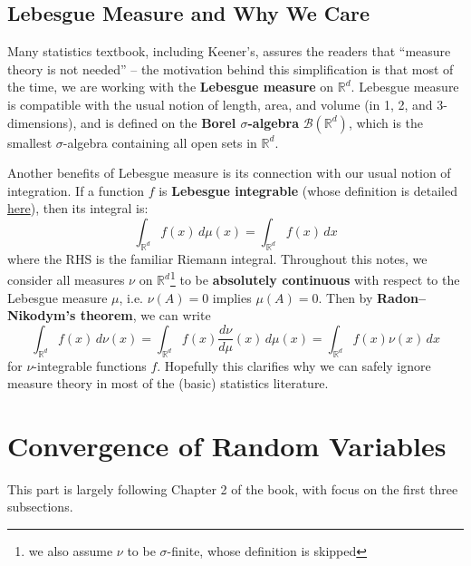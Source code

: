 \documentclass{article}
\begin{document}
\subsection{Lebesgue Measure and Why We Care}

Many statistics textbook, including Keener's, assures the readers that ``measure theory is not needed'' -- the motivation behind this simplification is that most of the time, we are working with the \textbf{Lebesgue measure} on $\mathbb{R}^d$. Lebesgue measure is compatible with the usual notion of length, area, and volume (in 1, 2, and 3-dimensions), and is defined on the \textbf{Borel $\sigma$-algebra} $\mathcal{B}(\mathbb{R}^d)$, which is the smallest $\sigma$-algebra containing all open sets in $\mathbb{R}^d$. 

Another benefits of Lebesgue measure is its connection with our usual notion of integration. If a function $f$ is \textbf{Lebesgue integrable} (whose definition is detailed \href{https://math.stackexchange.com/questions/1716526/what-does-it-mean-to-say-that-a-function-is-integrable-with-respect-to-a-measure}{here}), then its integral is:
\begin{equation}
    \int_{\mathbb{R}^d} f(x)\, d\mu(x) = \int_{\mathbb{R}^d} f(x)\, dx
\end{equation}
where the RHS is the familiar Riemann integral. Throughout this notes, we consider all measures $\nu$ on $\mathbb{R}^d$\footnote{we also assume $\nu$ to be $\sigma$-finite, whose definition is skipped} to be \textbf{absolutely continuous} with respect to the Lebesgue measure $\mu$, i.e. $\nu(A) = 0$ implies $\mu(A) = 0$. Then by \textbf{Radon–Nikodym's theorem}, we can write
\begin{equation}
    \int_{\mathbb{R}^d} f(x)\, d\nu(x) = \int_{\mathbb{R}^d} f(x) \frac{d\nu}{d\mu}(x)\, d\mu(x) = \int_{\mathbb{R}^d} f(x)\nu(x) \,dx
\end{equation}
for $\nu$-integrable functions $f$. Hopefully this clarifies why we can safely ignore measure theory in most of the (basic) statistics literature.


\newpage
\section{Convergence of Random Variables}


\begin{note}
	This part is largely following Chapter 2 of the book, with focus on the first three subsections.
\end{note}



% 
% 

\end{document}
